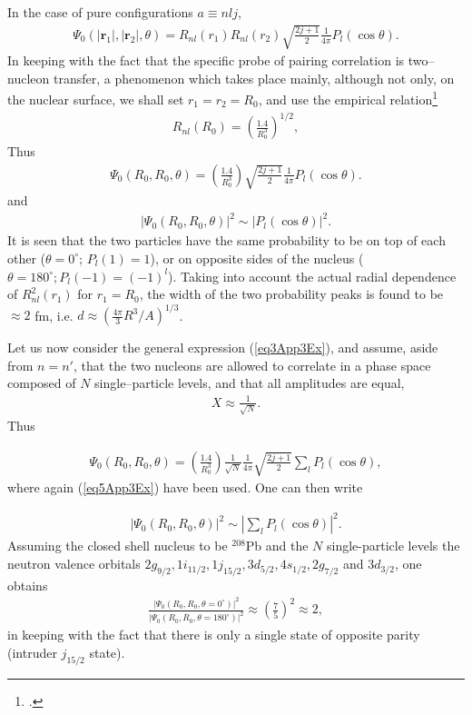 In the case of pure configurations $a\equiv nlj$,
\begin{align}\label{eq4App3Ex}
\Psi_0(|\mathbf r_1|,|\mathbf r_2|,\theta)
=R_{nl}(r_1)R_{nl}(r_2)\sqrt{\frac{2j+1}{2}}\frac{1}{4\pi}P_l(\cos\theta).
\end{align}
In keeping with the fact that the specific probe of pairing correlation is two--nucleon transfer, a phenomenon which takes place mainly, although not only, on the nuclear surface, we shall set $r_1=r_2=R_0$, and use the empirical relation\footnote{\cite{Bohr:69}.}
\begin{align}\label{eq5App3Ex}
R_{nl}(R_0)=\left(\frac{1.4}{R_0^3}\right)^{1/2},
\end{align}
Thus 
\begin{align}\label{eq6App3E}
\Psi_0(R_0,R_0,\theta)
=\left(\frac{1.4}{R_0^3}\right)\sqrt{\frac{2j+1}{2}}\frac{1}{4\pi}P_l(\cos\theta).
\end{align}
and 
\begin{align}\label{eq7App3E}
|\Psi_0(R_0,R_0,\theta)|^2\sim |P_l(\cos\theta)|^2.
\end{align}
It is seen that the two particles have the same probability to be on top of each other ($\theta=0^\circ$; $P_l(1)=1$), or on opposite sides of the nucleus ($\theta=180^\circ; P_l(-1)=(-1)^l$). Taking into account the actual radial dependence of $R^2_{nl}(r_1)$ for $r_1=R_0$, the width of the two probability peaks is found to be $\approx 2$ fm, i.e. $d\approx\left(\frac{4\pi}{3}R^3/A\right)^{1/3}$.

Let us now consider the general expression (\ref{eq3App3Ex}), and assume, aside from $n=n'$, that  the two nucleons are allowed to correlate in a phase space composed of $N$ single--particle levels, and that all amplitudes are equal,
\begin{align}\label{eq8App3E}
X\approx\frac{1}{\sqrt{N}}.
\end{align}
Thus 

\begin{align}\label{eq9App3E}
\Psi_0(R_0,R_0,\theta)
=\left(\frac{1.4}{R_0^3}\right)\frac{1}{\sqrt{N}}\frac{1}{4\pi}\sqrt{\frac{2j+1}{2}}\sum_lP_l(\cos\theta),
\end{align}
where again (\ref{eq5App3Ex}) have been used. One can then  write 

\begin{align}\label{eq10App3E}
|\Psi_0(R_0,R_0,\theta)|^2\sim |\sum_lP_l(\cos\theta)|^2.
\end{align}
Assuming the closed shell nucleus to be $^{208}$Pb and  the $N$ single-particle levels  the neutron valence orbitals $2g_{9/2},1i_{11/2},1j_{15/2},3d_{5/2},4s_{1/2},2g_{7/2}$ and $3d_{3/2}$, one obtains
\begin{align}\label{eq11App3E}
\frac{|\Psi_0(R_0,R_0,\theta=0^\circ)|^2}{|\Psi_0(R_0,R_0,\theta=180^\circ)|^2}\approx\left(\frac{7}{5}\right)^2\approx2,
\end{align}
in keeping with the fact that there is only a single state of opposite parity (intruder $j_{15/2}$ state).

